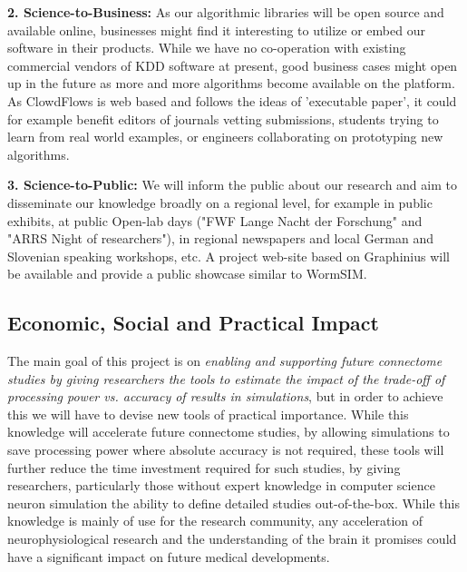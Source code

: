 \documentclass[a4paper,11pt]{article}
\begin{document}
\textbf{2. Science-to-Business:}  As our algorithmic libraries will be open source and available online, businesses might find it interesting to utilize or embed our software in their products. While we have no co-operation with existing commercial vendors of KDD software at present, good business cases might open up in the future as more and more algorithms become available on the platform. As ClowdFlows is web based and follows the ideas of 'executable paper', it could for example benefit editors of journals vetting submissions, students trying to learn from real world examples, or engineers collaborating on prototyping new algorithms.

\textbf{3. Science-to-Public:} We will inform the public about our research and aim to disseminate our knowledge broadly on a regional level, for example in public exhibits, at public Open-lab days ("FWF Lange Nacht der Forschung" and "ARRS Night of researchers"), in regional newspapers and local German and Slovenian speaking workshops, etc. A project web-site based on Graphinius will be available and provide a public showcase similar to WormSIM.

\subsection{Economic, Social and Practical Impact}

The main goal of this project is on \emph{enabling and supporting future connectome studies by giving researchers the tools to estimate the impact of the trade-off of processing power vs. accuracy of results in simulations}, but in order to achieve this we will have to devise new tools of practical importance. While this knowledge will accelerate future connectome studies, by allowing simulations to save processing power where absolute accuracy is not required, these tools will further reduce the time investment required for such studies, by giving researchers, particularly those without expert knowledge in computer science neuron simulation the ability to define detailed studies out-of-the-box. While this knowledge is mainly of use for the research community, any acceleration of neurophysiological research and the understanding of the brain it promises could have a significant impact on future medical developments.
\end{document}
